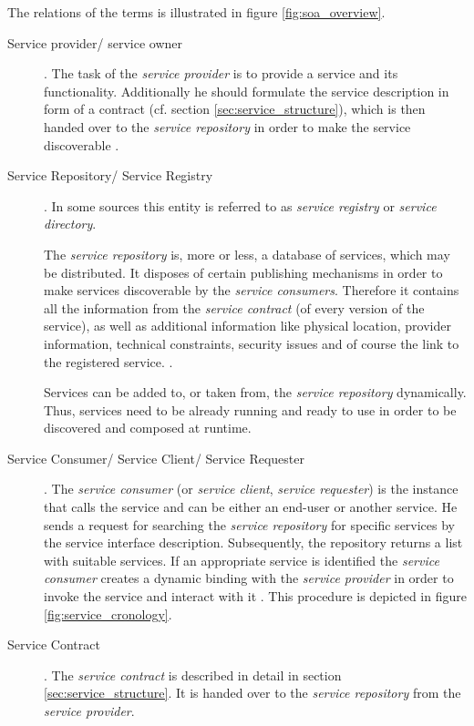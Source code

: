 The relations of the terms is illustrated in figure \ref{fig:soa_overview}.

\begin{description}
\item [Service provider/ service owner]. 
The task of the \emph{service provider} is to provide a service and its functionality. Additionally he should formulate the service description in form of a contract (cf. section \ref{sec:service_structure}), which is then handed over to the \emph{service repository} in order to make the service discoverable \cite{breivold}.

\item [Service Repository/ Service Registry].
In some sources this entity is referred to as \emph{service registry} or \emph{service directory}.

The \emph{service repository} is, more or less, a database of services, which may be distributed. It disposes of certain publishing mechanisms in order to make services discoverable by the \emph{service consumers}. Therefore it contains all the information from the \emph{service contract} (of every version of the service), as well as additional information like physical location, provider information, technical constraints, security issues and of course the link to the registered service. \cite[p.60-61]{krafzig} \cite{breivold} \cite{converge}.

Services can be added to, or taken from, the \emph{service repository} dynamically. Thus, services need to be already running and ready to use in order to be discovered and composed at runtime.

\item [Service Consumer/ Service Client/ Service Requester] .
The \emph{service consumer} (or \emph{service client}, \emph{service requester}) is the instance that calls the service and can be either an end-user or another service. He sends a request for searching the \emph{service repository} for specific services by the service interface description. Subsequently, the repository returns a list with suitable services. If an appropriate service is identified the \emph{service consumer} creates a dynamic binding with the \emph{service provider} in order to invoke the service and interact with it \cite{breivold} \cite{converge}. This procedure is depicted in figure \ref{fig:service_cronology}.

\item [Service Contract] .
The \emph{service contract} is described in detail in section \ref{sec:service_structure}. It is handed over to the \emph{service repository} from the \emph{service provider}.


\end{description}
